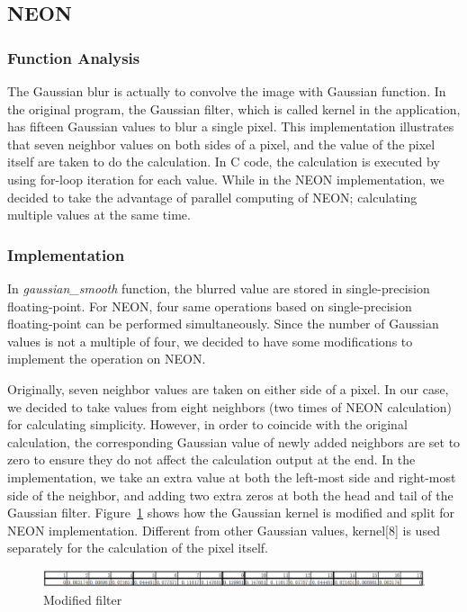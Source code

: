\subsection{NEON}
\subsubsection{Function Analysis}

The Gaussian blur is actually to convolve the image with Gaussian function. In the original program, the Gaussian filter, which is called kernel in the application, has fifteen Gaussian values to blur a single pixel. This implementation illustrates that seven neighbor values on both sides of a pixel, and the value of the pixel itself are taken to do the calculation. In C code, the calculation is executed by using for-loop iteration for each value. While in the NEON implementation, we decided to take the advantage of parallel computing of NEON; calculating multiple values at the same time.

\subsubsection{Implementation}

In \textit{gaussian\_smooth} function, the blurred value are stored in single-precision floating-point. For NEON, four same operations based on single-precision floating-point can be performed simultaneously. Since the number of Gaussian values is not a multiple of four, we decided to have some modifications to implement the operation on NEON. 

Originally, seven neighbor values are taken on either side of a pixel. In our case, we decided to take values from eight neighbors (two times of NEON calculation) for calculating simplicity. However, in order to coincide with the original calculation, the corresponding Gaussian value of newly added neighbors are set to zero to ensure they do not affect the calculation output at the end. In the implementation, we take an extra value at both the left-most side and right-most side of the neighbor, and adding two extra zeros at both the head and tail of the Gaussian filter. Figure~\ref{fig:newfilter} shows how the Gaussian kernel is modified and split for NEON implementation. Different from other Gaussian values, kernel[8] is used separately for the calculation of the pixel itself. 

\begin{figure}
\centering
\includegraphics[width=\linewidth]{drawings/filter}
\caption{Modified filter}
\label{fig:newfilter}
\end{figure}

